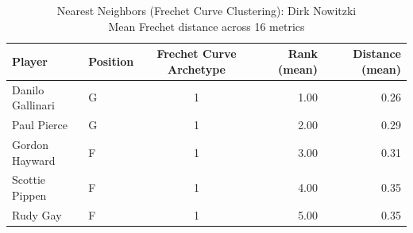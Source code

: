 \begin{table}[t]
\caption*{
{\fontsize{20}{25} Nearest Neighbors (Frechet Curve Clustering): Dirk Nowitzki\fontsize{12}{15}\selectfont } \\ 
{\fontsize{14}{17}\selectfont  Mean Frechet distance across 16 metrics\fontsize{12}{15}\selectfont }
} 
\fontsize{12.0pt}{14.0pt}\selectfont
\begin{tabular*}{\linewidth}{@{\extracolsep{\fill}}llcrr}
\toprule
Player & Position & Frechet Curve Archetype & Rank (mean) & Distance (mean) \\ 
\midrule\addlinespace[2.5pt]
Danilo Gallinari & G & 1 & 1.00 & 0.26 \\ 
Paul Pierce & G & 1 & 2.00 & 0.29 \\ 
Gordon Hayward & F & 1 & 3.00 & 0.31 \\ 
Scottie Pippen & F & 1 & 4.00 & 0.35 \\ 
Rudy Gay & F & 1 & 5.00 & 0.35 \\ 
\bottomrule
\end{tabular*}
\end{table}

